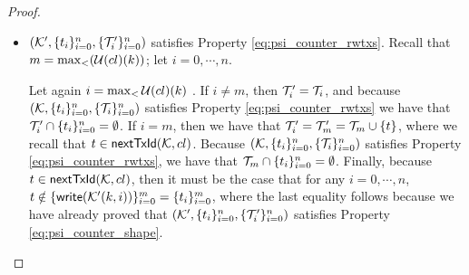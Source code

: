 \begin{proof}
\begin{itemize}
\begin{itemize}
%

\item $(\mathcal{K}',  \{t_{i}\}_{i=0}^{n}, \{\mathcal{T}'_{i}\}_{i=0}^{n})$ satisfies Property \eqref{eq:psi_counter_rwtxs}. 
Recall that $m = \max_{<}(\mathcal{U}({cl})(k))$; let $i=0,\cdots,n$.

Let again $i = \max_{<}\mathcal{U}({cl})(k)$ . 
If $i \neq m$, then $\mathcal{T}'_{i} = \mathcal{T}_{i}$, and because $(\mathcal{K},  \{t_{i}\}_{i=0}^{n}, \{\mathcal{T}_{i}\}_{i=0}^{n})$ 
satisfies Property \eqref{eq:psi_counter_rwtxs} 
we have that $\mathcal{T}'_{i} \cap \{t_{i}\}_{i=0}^{n} = \emptyset$. If $i = m$, then 
we have that $\mathcal{T}'_{i} = \mathcal{T}'_{m} = \mathcal{T}_{m} \cup \{t\}$, where we recall that $t \in \mathsf{nextTxId}(\mathcal{K}, {cl})$. 
Because $(\mathcal{K},  \{t_{i}\}_{i=0}^{n}, \{\mathcal{T}_{i}\}_{i=0}^{n})$ 
satisfies Property \eqref{eq:psi_counter_rwtxs}, we have that $\mathcal{T}_{m} \cap \{t_{i}\}_{i=0}^{n} 
= \emptyset$. Finally, because $t \in \mathsf{nextTxId}(\mathcal{K},{cl})$, then it must be the case that 
for any $i = 0,\cdots, n$, $t \notin \{\mathsf{write}(\mathcal{K}'(k,i))\}_{i=0}^{m} = \{t_{i}\}_{i=0}^{m}$,  
where the last equality follows because we have already proved that $(\mathcal{K}',  \{t_{i}\}_{i=0}^{n}, \{\mathcal{T}'_{i}\}_{i=0}^{n})$ 
satisfies Property \eqref{eq:psi_counter_shape}.


\end{itemize}
\end{itemize}
\end{proof}
